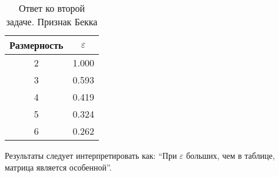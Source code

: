 \begin{table}[H]
	\begin{center}
		\begin{tabular}{|c|c|}
			\hline
			Размерность & $\varepsilon$ \\
			\hline
			2 & 1.000 \\
			\hline
			3 & 0.593 \\
			\hline
			4 & 0.419 \\
			\hline
			5 & 0.324 \\
			\hline
			6 & 0.262 \\
			\hline
		\end{tabular}
		\caption{Ответ ко второй задаче. Признак Бекка}
	\end{center}
\end{table}

\begin{remark}
	Результаты следует интерпретировать как: ``При $\varepsilon$ больших, чем в таблице, матрица является особенной''.
\end{remark}